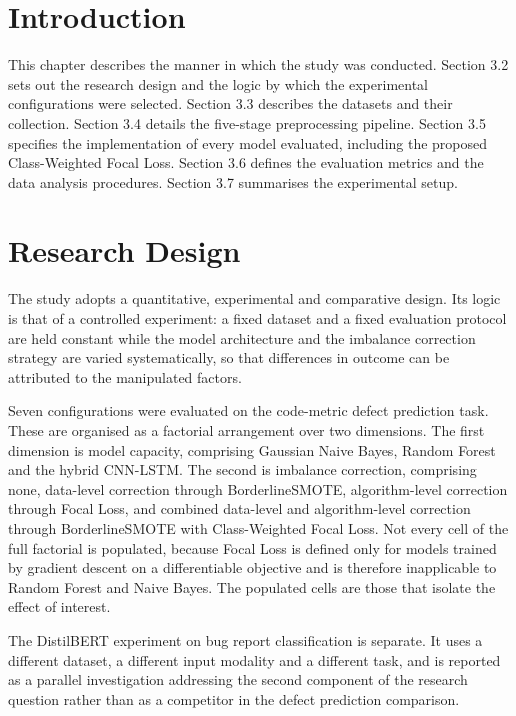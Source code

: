 \documentclass[12pt,a4paper,oneside]{report}
\begin{document}
\section{Introduction}

This chapter describes the manner in which the study was conducted. Section 3.2 sets out the research design and the logic by which the experimental configurations were selected. Section 3.3 describes the datasets and their collection. Section 3.4 details the five-stage preprocessing pipeline. Section 3.5 specifies the implementation of every model evaluated, including the proposed Class-Weighted Focal Loss. Section 3.6 defines the evaluation metrics and the data analysis procedures. Section 3.7 summarises the experimental setup.

\section{Research Design}

The study adopts a quantitative, experimental and comparative design. Its logic is that of a controlled experiment: a fixed dataset and a fixed evaluation protocol are held constant while the model architecture and the imbalance correction strategy are varied systematically, so that differences in outcome can be attributed to the manipulated factors.

Seven configurations were evaluated on the code-metric defect prediction task. These are organised as a factorial arrangement over two dimensions. The first dimension is model capacity, comprising Gaussian Naive Bayes, Random Forest and the hybrid CNN-LSTM. The second is imbalance correction, comprising none, data-level correction through BorderlineSMOTE, algorithm-level correction through Focal Loss, and combined data-level and algorithm-level correction through BorderlineSMOTE with Class-Weighted Focal Loss. Not every cell of the full factorial is populated, because Focal Loss is defined only for models trained by gradient descent on a differentiable objective and is therefore inapplicable to Random Forest and Naive Bayes. The populated cells are those that isolate the effect of interest.

The DistilBERT experiment on bug report classification is separate. It uses a different dataset, a different input modality and a different task, and is reported as a parallel investigation addressing the second component of the research question rather than as a competitor in the defect prediction comparison.
\end{document}
